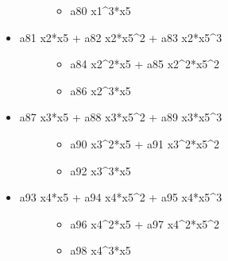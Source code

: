 \documentclass[letterpaper,10pt,english]{sphinxmanual}
\begin{document}
\begin{fulllineitems}
\begin{description}
\begin{itemize}
\begin{description}
\begin{itemize}
\item {} 
a80 x1\textasciicircum{}3*x5

\end{itemize}

\end{description}

\item {} \begin{description}
\item[{a81 x2*x5 + a82 x2*x5\textasciicircum{}2 + a83 x2*x5\textasciicircum{}3}] \leavevmode\begin{itemize}
\item {} 
a84 x2\textasciicircum{}2*x5 + a85 x2\textasciicircum{}2*x5\textasciicircum{}2

\item {} 
a86 x2\textasciicircum{}3*x5

\end{itemize}

\end{description}

\item {} \begin{description}
\item[{a87 x3*x5 + a88 x3*x5\textasciicircum{}2 + a89 x3*x5\textasciicircum{}3}] \leavevmode\begin{itemize}
\item {} 
a90 x3\textasciicircum{}2*x5 + a91 x3\textasciicircum{}2*x5\textasciicircum{}2

\item {} 
a92 x3\textasciicircum{}3*x5

\end{itemize}

\end{description}

\item {} \begin{description}
\item[{a93 x4*x5 + a94 x4*x5\textasciicircum{}2 + a95 x4*x5\textasciicircum{}3}] \leavevmode\begin{itemize}
\item {} 
a96 x4\textasciicircum{}2*x5 + a97 x4\textasciicircum{}2*x5\textasciicircum{}2

\item {} 
a98 x4\textasciicircum{}3*x5

\end{itemize}

\end{description}


\end{itemize}
\end{description}
\end{fulllineitems}
\end{document}
